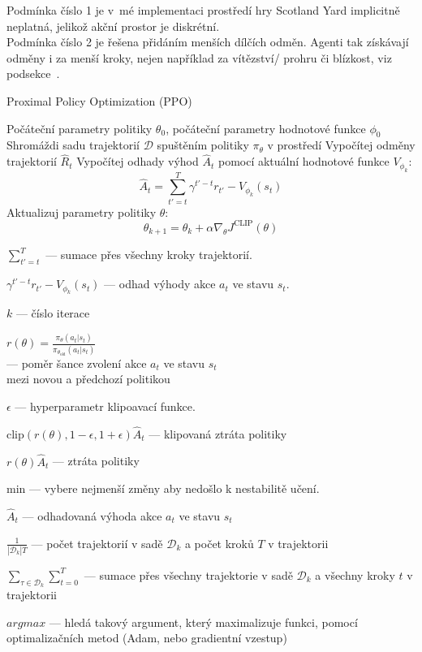 Podmínka číslo 1 je v~mé implementaci prostředí hry Scotland Yard implicitně neplatná, jelikož akční prostor je diskrétní.\\
Podmínka číslo 2 je řešena přidáním menších dílčích odměn.
Agenti tak získávají odměny i za menší kroky, nejen například za vítězství/ prohru či blízkost, viz podsekce~.\\

\pagebreak

\begin{algorithm}
  \caption{Proximal Policy Optimization (PPO)}
  \begin{algorithmic}[1]
  \State Počáteční parametry politiky $\theta_0$, počáteční parametry hodnotové funkce $\phi_0$
      \State Shromáždi sadu trajektorií $\mathcal{D}$ spuštěním politiky $\pi_\theta$ v prostředí
      \State Vypočítej odměny trajektorií $\hat{R}_t$
      \State Vypočítej odhady výhod $\hat{A}_t$ pomocí aktuální hodnotové funkce $V_{\phi_k}$:
      \[
      \hat{A}_t = \sum_{t'=t}^T \gamma^{t'-t} r_{t'} - V_{\phi_k}(s_t)
      \]
      \State Aktualizuj parametry politiky $\theta$:
      \[
        \theta_{k+1} = \theta_k + \alpha \nabla_\theta J^{\text{CLIP}}(\theta)
      \]
    \EndFor
  \end{algorithmic}
  \end{algorithm}
  \begin{myitemize}
    \item $\sum_{t'=t}^T$ --- sumace přes všechny kroky trajektorií.
    \item $\gamma^{t'-t} r_{t'} - V_{\phi_k}(s_t)$ --- odhad výhody akce $a_t$ ve stavu $s_t$.
    \item $k$ --- číslo iterace
    \item $r(\theta) = \frac{\pi_\theta(a_t|s_t)}{\pi_{\theta_{\text{old}}}(a_t|s_t)}$\\ --- poměr šance zvolení akce $a_t$ ve stavu $s_t$ \\ mezi novou a předchozí politikou
    \item $\epsilon$ --- hyperparametr klipoavací funkce.
    \item $\text{clip}(r(\theta), 1-\epsilon, 1+\epsilon) \hat{A}_t$ --- klipovaná ztráta politiky
    \item $r(\theta) \hat{A}_t$ --- ztráta politiky
    \item min ---  vybere nejmenší změny aby nedošlo k nestabilitě učení.
    \item $\hat{A}_t$ --- odhadovaná výhoda akce $a_t$ ve stavu $s_t$
    \item $\frac{1}{\left|\mathcal{D}_k\right|T}$ --- počet trajektorií v sadě $\mathcal{D}_k$ a počet kroků $T$ v trajektorii
    \item $\displaystyle\sum_{\tau \in \mathcal{D}_k} \sum_{t=0}^T$ --- sumace přes všechny trajektorie v sadě $\mathcal{D}_k$ a všechny kroky $t$ v trajektorii
    \item $argmax$ --- hledá takový argument, který maximalizuje funkci, pomocí optimalizačních metod (Adam, nebo gradientní vzestup)
\end{myitemize}



